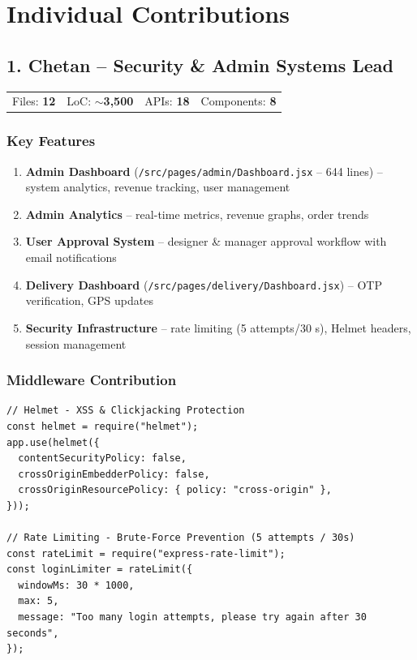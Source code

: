 \documentclass[a4paper,11pt]{article}
\begin{document}
\section{Individual Contributions}

\subsection{\textcolor{chetanCol}{1. Chetan} -- Security \& Admin Systems Lead}

\begin{mdframed}[linecolor=chetanCol!60, backgroundcolor=chetanCol!5, roundcorner=4pt]
\begin{tabular}{@{}L{3cm}L{3cm}L{3cm}L{3cm}@{}}
  Files: \textbf{12} & LoC: \textbf{$\sim$3,500} & APIs: \textbf{18} & Components: \textbf{8}
\end{tabular}
\end{mdframed}

\subsubsection{Key Features}
\begin{enumerate}[noitemsep]
  \item \textbf{Admin Dashboard} (\texttt{/src/pages/admin/Dashboard.jsx} -- 644 lines)
        -- system analytics, revenue tracking, user management
  \item \textbf{Admin Analytics} -- real-time metrics, revenue graphs, order trends
  \item \textbf{User Approval System} -- designer \& manager approval workflow with email notifications
  \item \textbf{Delivery Dashboard} (\texttt{/src/pages/delivery/Dashboard.jsx}) -- OTP verification, GPS updates
  \item \textbf{Security Infrastructure} -- rate limiting (5 attempts/30 s), Helmet headers, session management
\end{enumerate}

\subsubsection{Middleware Contribution}
\begin{lstlisting}[caption={Security Headers (Chetan)}]
// Helmet - XSS & Clickjacking Protection
const helmet = require("helmet");
app.use(helmet({
  contentSecurityPolicy: false,
  crossOriginEmbedderPolicy: false,
  crossOriginResourcePolicy: { policy: "cross-origin" },
}));

// Rate Limiting - Brute-Force Prevention (5 attempts / 30s)
const rateLimit = require("express-rate-limit");
const loginLimiter = rateLimit({
  windowMs: 30 * 1000,
  max: 5,
  message: "Too many login attempts, please try again after 30 seconds",
});
\end{lstlisting}
\end{document}
